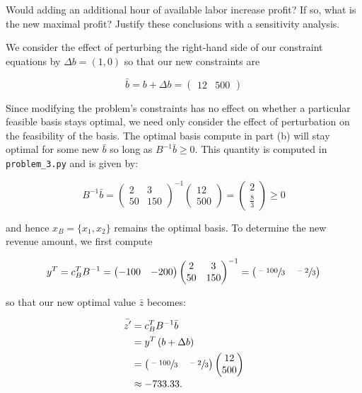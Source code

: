 Would adding an additional hour of available labor increase profit? If so, what is the new maximal profit? Justify these
conclusions with a sensitivity analysis.

\begin{solution}
  We consider the effect of perturbing the right-hand side of our constraint equations by $\Delta b = (1, 0)$ so that
  our new constraints are 

  $$
  \bar{b} = b + \Delta b = \begin{pmatrix} 12 & 500 \end{pmatrix}
  $$

  Since modifying the problem's constraints has no effect on whether a particular feasible basis stays optimal, we need
  only consider the effect of perturbation on the feasibility of the basis. The optimal basis compute in part (b) will
  stay optimal for some new $\bar{b}$ so long as $B^{-1} \bar{b} \ge 0$. This quantity is computed in 
  \texttt{problem\_3.py} and is given by:

  $$
  B^{-1} \bar{b} = \begin{pmatrix} 
    2  & 3    \\
    50 & 150
  \end{pmatrix}^{-1} \begin{pmatrix} 
    12  \\
    500 
  \end{pmatrix} = \begin{pmatrix} 
    2  \\
    \frac{8}{3}
  \end{pmatrix} \ge 0
  $$

  and hence $x_B = \{ x_1, x_2 \}$ remains the optimal basis. To determine the new revenue amount, we first compute

  $$
  y^T = c_B^T B^{-1} = \begin{pmatrix*}[r]
    -100 & -200
  \end{pmatrix*} \begin{pmatrix}
    2  & 3    \\
    50 & 150
  \end{pmatrix}^{-1} = \begin{pmatrix}
    \sfrac{-100}{3} & \sfrac{-2}{3}
  \end{pmatrix}
  $$

  so that our new optimal value $\bar{z}$ becomes: 
  
  \begin{align*}
    \bar{z'} &= c_B^T B^{-1} \bar{b} \\
             &= y^T \left(b + \Delta b \right) \\
             &=\begin{pmatrix}
                 \sfrac{-100}{3} & \sfrac{-2}{3}
               \end{pmatrix} \begin{pmatrix}
                 12  \\
                 500
               \end{pmatrix} \\
             &\approx -733.33.
  \end{align*}


\end{solution}
